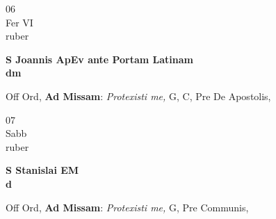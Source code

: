 \documentclass[10pt, openany]{book}
\begin{document}
        \begin{center}
            \begin{minipage}{3.5in}
                \vspace{2em}
                \begin{minipage}{0.5in}
                    {\Huge 06} \\
                    {\normalsize Fer VI} \\
                    {\normalsize ruber}
                \end{minipage}
                \begin{minipage}{3.0in}
                    \textbf{ \large S Joannis ApEv ante Portam Latinam \\
                    \textnormal{\normalsize dm}} \\ 
                \end{minipage}
                \begin{justify}Off Ord, \textbf{Ad Missam}: \textit{Protexisti me,} G, C, Pre De Apostolis,  
                \end{justify}
            \end{minipage}
        \end{center}
    
        \begin{center}
            \begin{minipage}{3.5in}
                \vspace{2em}
                \begin{minipage}{0.5in}
                    {\Huge 07} \\
                    {\normalsize Sabb} \\
                    {\normalsize ruber}
                \end{minipage}
                \begin{minipage}{3.0in}
                    \textbf{ \large S Stanislai EM \\
                    \textnormal{\normalsize d}} \\ 
                \end{minipage}
                \begin{justify}Off Ord, \textbf{Ad Missam}: \textit{Protexisti me,} G, Pre Communis,  
                \end{justify}
            \end{minipage}
        \end{center}
    
\end{document}
